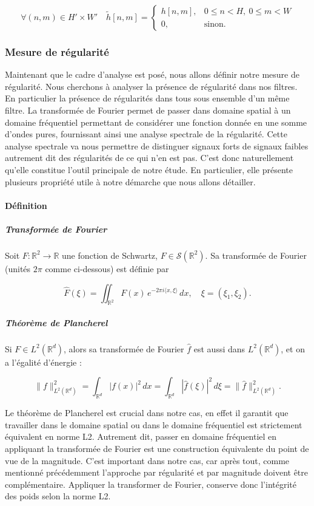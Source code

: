 \documentclass[12pt,a4paper]{article}
\begin{document}
\[
\forall (n,m)\in H' \times W' \quad 
\tilde{h}[n,m] =
\begin{cases}
h[n,m], & 0 \leq n < H,\ 0 \leq m < W \\
0, & \text{sinon}.
\end{cases}
\]

\subsubsection{Mesure de régularité}
Maintenant que le cadre d'analyse est posé, nous allons définir notre mesure de régularité. Nous cherchons à analyser la présence de régularité dans nos filtres. En particulier la présence de régularités dans tous sous ensemble d'un même filtre. La transformée de Fourier permet de passer dans domaine spatial à un domaine fréquentiel permettant de considérer une fonction donnée en une somme d'ondes pures, fournissant ainsi une analyse spectrale de la régularité. Cette analyse spectrale va nous permettre de distinguer signaux forts de signaux faibles autrement dit des régularités de ce qui n'en est pas.  C'est donc naturellement qu'elle constitue l'outil principale de notre étude. En particulier, elle présente plusieurs propriété utile à notre démarche que nous allons détailler. 
\paragraph{Définition}
\subparagraph{Transformée de Fourier}
Soit $F : \mathbb{R}^2 \to \mathbb{R}$ une fonction de Schwartz, 
$F \in \mathcal{S}(\mathbb{R}^2)$.  
Sa transformée de Fourier (unités $2\pi$ comme ci-dessous) est définie par

\[
\widehat{F}(\xi) = \iint_{\mathbb{R}^2} F(x)\, e^{-2\pi i \langle x, \xi \rangle}\, dx,
\quad \xi = (\xi_1, \xi_2).
\]
\subparagraph{Théorème de Plancherel}

Si $F \in L^2(\mathbb{R}^d)$, alors sa transformée de Fourier $\widehat{f}$ est aussi dans 
$L^2(\mathbb{R}^d)$, et on a l’égalité d’énergie :

\[
\|f\|_{L^2(\mathbb{R}^d)}^2 
= \int_{\mathbb{R}^d} |f(x)|^2 \, dx
= \int_{\mathbb{R}^d} |\widehat{f}(\xi)|^2 \, d\xi
= \|\widehat{f}\|_{L^2(\mathbb{R}^d)}^2.
\]

Le théorème de Plancherel est crucial dans notre cas, en effet il garantit que travailler dans le domaine spatial ou dans le domaine fréquentiel est strictement équivalent en norme L2. Autrement dit, passer en domaine fréquentiel en appliquant la transformée de Fourier est une construction équivalente du point de vue de la magnitude. C'est important dans notre cas, car après tout, comme mentionné précédemment l'approche par régularité et par magnitude doivent être complémentaire. Appliquer la transformer de Fourier, conserve donc l'intégrité des poids selon la norme L2.   
\end{document}
